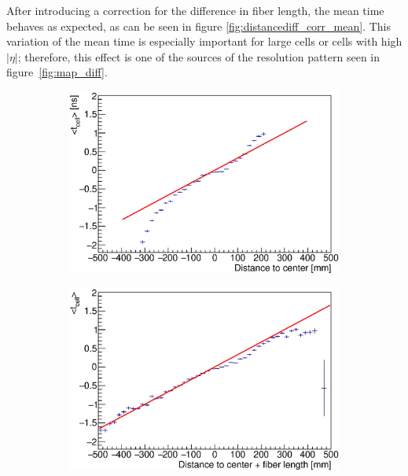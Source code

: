 After introducing a correction for the difference in fiber length, the mean time behaves as expected, as can be seen in figure \ref{fig:distancediff_corr_mean}.
This variation of the mean time is especially important for large cells or cells with high $|\eta|$; therefore, this effect is one of the sources of the resolution pattern seen in figure~\ref{fig:map_diff}.

\begin{figure}[tb!]
  \begin{center}
    \begin{subfigure}{0.49\textwidth}
      \includegraphics[width=\textwidth]{TileTimingPerformance/Figures/distancediff_mean.eps}
      \caption{}
      \label{fig:distancediff_mean}
    \end{subfigure}
    \begin{subfigure}{0.49\textwidth}
      \includegraphics[width=\textwidth]{TileTimingPerformance/Figures/distancediff_corr_mean.eps}

\end{subfigure}
\end{center}
\end{figure}

